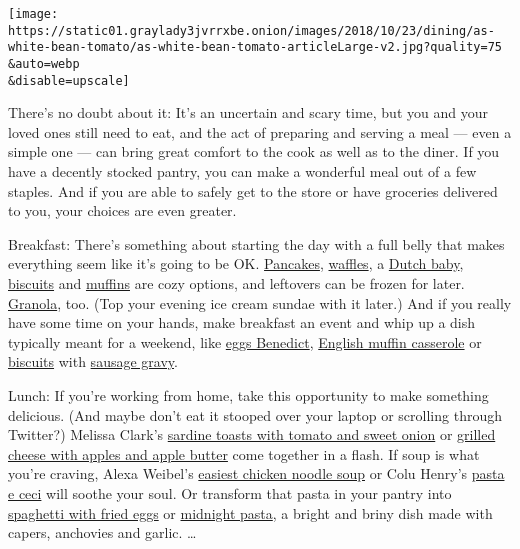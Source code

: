 \texttt{[image: https://static01.graylady3jvrrxbe.onion/images/2018/10/23/dining/as-white-bean-tomato/as-white-bean-tomato-articleLarge-v2.jpg?quality=75\\\&auto=webp\\\&disable=upscale]}

There's no doubt about it: It's an uncertain and scary time, but you and
your loved ones still need to eat, and the act of preparing and serving
a meal --- even a simple one --- can bring great comfort to the cook as
well as to the diner. If you have a decently stocked pantry, you can
make a wonderful meal out of a few staples. And if you are able to
safely get to the store or have groceries delivered to you, your choices
are even greater.

Breakfast: There's something about starting the day with a full belly
that makes everything seem like it's going to be OK.
\href{https://cooking.nytimes3xbfgragh.onion/recipes/1893-everyday-pancakes}{Pancakes},
\href{https://cooking.nytimes3xbfgragh.onion/recipes/1017409-waffles}{waffles},
a
\href{https://cooking.nytimes3xbfgragh.onion/recipes/6648-dutch-baby}{Dutch
baby},
\href{https://cooking.nytimes3xbfgragh.onion/recipes/1015210-buttermilk-biscuits}{biscuits}
and
\href{https://cooking.nytimes3xbfgragh.onion/recipes/11826-simple-blueberry-muffins}{muffins}
are cozy options, and leftovers can be frozen for later.
\href{https://cooking.nytimes3xbfgragh.onion/68861692-nyt-cooking/477-our-favorite-granolas}{Granola},
too. (Top your evening ice cream sundae with it later.) And if you
really have some time on your hands, make breakfast an event and whip up
a dish typically meant for a weekend, like
\href{https://cooking.nytimes3xbfgragh.onion/recipes/1018626-eggs-benedict}{eggs
Benedict},
\href{https://cooking.nytimes3xbfgragh.onion/recipes/1020714-english-muffin-breakfast-casserole}{English
muffin casserole} or
\href{https://cooking.nytimes3xbfgragh.onion/recipes/1013741-all-purpose-biscuits}{biscuits}
with
\href{https://cooking.nytimes3xbfgragh.onion/recipes/1013740-sausage-gravy}{sausage
gravy}.

Lunch: If you're working from home, take this opportunity to make
something delicious. (And maybe don't eat it stooped over your laptop or
scrolling through Twitter?) Melissa Clark's
\href{https://cooking.nytimes3xbfgragh.onion/recipes/1020464-sardine-toasts-with-tomato-and-sweet-onion}{sardine
toasts with tomato and sweet onion} or
\href{https://cooking.nytimes3xbfgragh.onion/recipes/1020532-grilled-cheese-with-apples-and-apple-butter}{grilled
cheese with apples and apple butter} come together in a flash. If soup
is what you're craving, Alexa Weibel's
\href{https://cooking.nytimes3xbfgragh.onion/recipes/1020746-easiest-chicken-noodle-soup}{easiest
chicken noodle soup} or Colu Henry's
\href{https://cooking.nytimes3xbfgragh.onion/recipes/1020860-pasta-e-ceci-italian-pasta-and-chickpea-stew}{pasta
e ceci} will soothe your soul. Or transform that pasta in your pantry
into
\href{https://cooking.nytimes3xbfgragh.onion/recipes/8357-spaghetti-with-fried-eggs}{spaghetti
with fried eggs} or
\href{https://cooking.nytimes3xbfgragh.onion/recipes/1020668-midnight-pasta-with-roasted-garlic-olive-oil-and-chile}{midnight
pasta}, a bright and briny dish made with capers, anchovies and garlic.
\ldots{}

